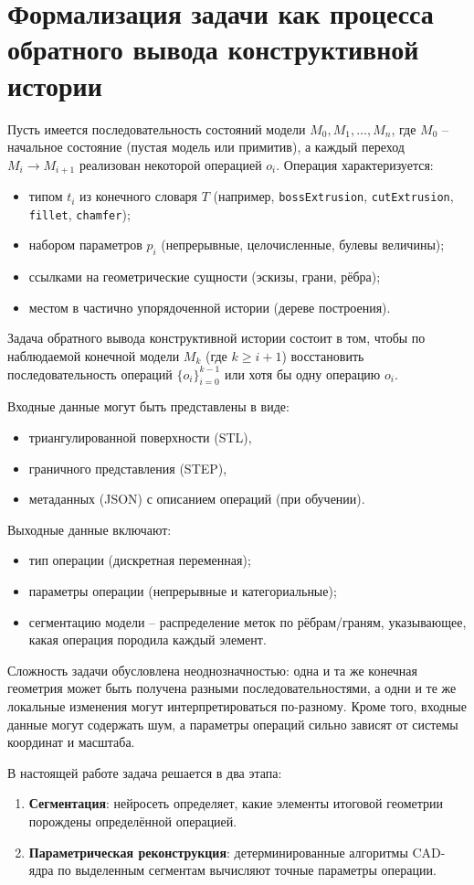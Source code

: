 \section{Формализация задачи как процесса обратного вывода конструктивной истории}

Пусть имеется последовательность состояний модели $M_0, M_1, \dots, M_n$, где $M_0$ – начальное состояние (пустая модель или примитив), а каждый переход $M_{i} \to M_{i+1}$ реализован некоторой операцией $o_i$. Операция характеризуется:
\begin{itemize}
    \item типом $t_i$ из конечного словаря $T$ (например, \texttt{bossExtrusion}, \texttt{cutExtrusion}, \texttt{fillet}, \texttt{chamfer});
    \item набором параметров $p_i$ (непрерывные, целочисленные, булевы величины);
    \item ссылками на геометрические сущности (эскизы, грани, рёбра);
    \item местом в частично упорядоченной истории (дереве построения).
\end{itemize}

Задача обратного вывода конструктивной истории состоит в том, чтобы по наблюдаемой конечной модели $M_k$ (где $k \ge i+1$) восстановить последовательность операций $\{o_i\}_{i=0}^{k-1}$ или хотя бы одну операцию $o_i$.

Входные данные могут быть представлены в виде:
\begin{itemize}
    \item триангулированной поверхности (STL),
    \item граничного представления (STEP),
    \item метаданных (JSON) с описанием операций (при обучении).
\end{itemize}

Выходные данные включают:
\begin{itemize}
    \item тип операции (дискретная переменная);
    \item параметры операции (непрерывные и категориальные);
    \item сегментацию модели – распределение меток по рёбрам/граням, указывающее, какая операция породила каждый элемент.
\end{itemize}

Сложность задачи обусловлена неоднозначностью: одна и та же конечная геометрия может быть получена разными последовательностями, а одни и те же локальные изменения могут интерпретироваться по-разному. Кроме того, входные данные могут содержать шум, а параметры операций сильно зависят от системы координат и масштаба.

В настоящей работе задача решается в два этапа:
\begin{enumerate}
    \item \textbf{Сегментация}: нейросеть определяет, какие элементы итоговой геометрии порождены определённой операцией.
    \item \textbf{Параметрическая реконструкция}: детерминированные алгоритмы CAD-ядра по выделенным сегментам вычисляют точные параметры операции.
\end{enumerate}

